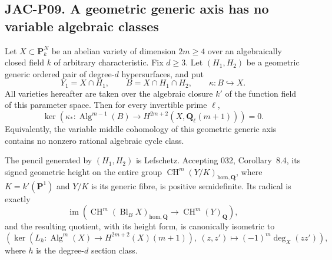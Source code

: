 
\subsection*{JAC-P09. A geometric generic axis has no variable algebraic classes}

\begin{proposition}[JAC-P09]
\label{jac:P09}
Let $X\subset\mathbf P^N_k$ be an abelian variety of dimension
$2m\ge4$ over an algebraically closed field $k$ of arbitrary
characteristic. Fix $d\ge3$. Let $(H_1,H_2)$ be a geometric generic
ordered pair of degree-$d$ hypersurfaces, and put
\[
 Y_1=X\cap H_1,\qquad B=X\cap H_1\cap H_2,
 \qquad \kappa:B\hookrightarrow X.
\]
All varieties hereafter are taken over the algebraic closure $k'$ of
the function field of this parameter space. Then for every invertible
prime $\ell$,
\[
 \ker\!\left(\kappa_*:\operatorname{Alg}^{m-1}(B)
             \longrightarrow H^{2m+2}(X,\mathbf Q_\ell(m+1))\right)=0.
                                                        \tag{JAC.P09.1}
\]
Equivalently, the variable middle cohomology of this geometric generic
axis contains no nonzero rational algebraic cycle class.

The pencil generated by $(H_1,H_2)$ is Lefschetz. Accepting 032,
Corollary~8.4, its signed geometric height on the entire group
$\operatorname{CH}^{m}(Y/K)_{\mathrm{hom},\mathbf Q}$, where
$K=k'(\mathbf P^1)$ and $Y/K$ is its generic fibre, is positive
semidefinite. Its radical is exactly
\[
 \operatorname{im}\!\left(
  \operatorname{CH}^{m}(\operatorname{Bl}_B X)_{
       \mathrm{hom},\mathbf Q}
     \longrightarrow\operatorname{CH}^{m}(Y)_{\mathbf Q}\right),
                                                        \tag{JAC.P09.2}
\]
and the resulting quotient, with its height form, is canonically
isometric to
\[
 \left(\ker\!\left(L_h:\operatorname{Alg}^{m}(X)
                        \longrightarrow H^{2m+2}(X)(m+1)\right),
       \ (z,z')\longmapsto(-1)^m\deg_X(zz')\right),
                                                        \tag{JAC.P09.3}
\]
where $h$ is the degree-$d$ section class.
\end{proposition}

